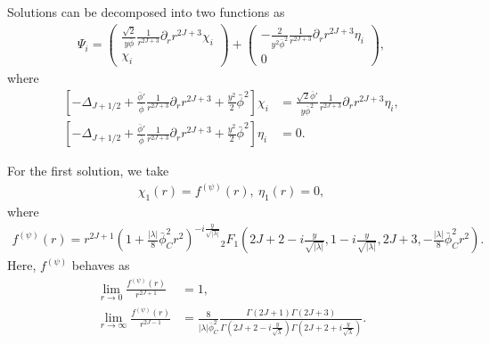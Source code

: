 \documentclass[12pt]{article}
\begin{document}
Solutions can be decomposed into two functions as
\begin{align}
 \Psi_i =
 \begin{pmatrix}
  \frac{\sqrt{2}}{y\bar\phi}\frac{1}{r^{2J+3}}\partial_rr^{2J+3}\chi_i \\
  \chi_i
 \end{pmatrix} +
 \begin{pmatrix}
  -\frac{2}{y^2\bar\phi^2}\frac{1}{r^{2J+3}}\partial_rr^{2J+3}\eta_i \\
  0
 \end{pmatrix},
\end{align}
where
\begin{align}
 \left[
  -\Delta_{J+1/2}
  +\frac{\bar\phi'}{\bar\phi}\frac{1}{r^{2J+3}}\partial_rr^{2J+3}
  +\frac{y^2}{2}\bar\phi^2
 \right]\chi_i
  & =\frac{\sqrt{2}\bar\phi'}{y\bar\phi^2}\frac{1}{r^{2J+3}}\partial_rr^{2J+3}\eta_i, \\
 \left[
  -\Delta_{J+1/2}
  +\frac{\bar\phi'}{\bar\phi}\frac{1}{r^{2J+3}}\partial_rr^{2J+3}
  +\frac{y^2}{2}\bar\phi^2
 \right]\eta_i
  & =0.
\end{align}

For the first solution, we take
\begin{align}
 \chi_1(r) = f^{(\psi)}(r),~\eta_1(r) = 0,
\end{align}
where
\begin{align}
 f^{(\psi)}(r) = r^{2J+1}
 \left(
  1+\frac{|\lambda|}{8}\bar\phi_C^2r^2
 \right)^{-i\frac{y}{\sqrt{|\lambda|}}}{}_2F_1
 \left(
  2J+2-i\frac{y}{\sqrt{|\lambda|}},1-i\frac{y}{\sqrt{|\lambda|}},
  2J+3,-\frac{|\lambda|}{8}\bar\phi_C^2r^2
 \right).
\end{align}
Here, $f^{(\psi)}$ behaves as
\begin{align}
 \lim_{r\to0}\frac{f^{(\psi)}(r)}{r^{2J+1}}
  & = 1,                              \\
 \lim_{r\to\infty}\frac{f^{(\psi)}(r)}{r^{2J-1}}
  & = \frac{8}{|\lambda|\bar\phi_C^2}
 \frac{\Gamma(2J+1)\Gamma(2J+3)}{\Gamma
  \left(
   2J+2-i\frac{y}{\sqrt{\lambda}}
  \right)
  \Gamma
  \left(
   2J+2+i\frac{y}{\sqrt{\lambda}}
  \right)}.
\end{align}
\end{document}
